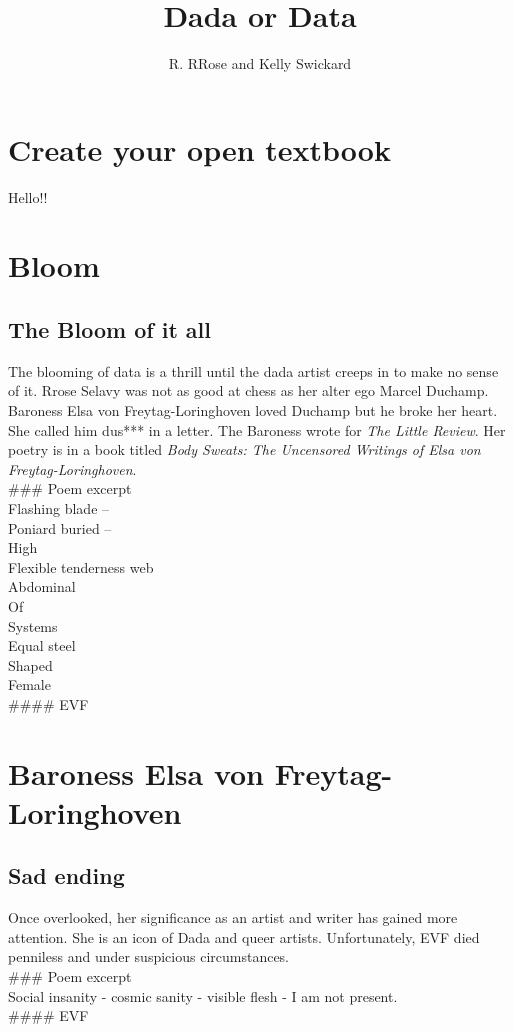 \documentclass[
  openany]{book}
\title{Dada or Data}
\author{R. RRose and Kelly Swickard}
\date{}
\begin{document}
\maketitle

{
\setcounter{tocdepth}{1}
\tableofcontents
}
\hypertarget{create-your-open-textbook}{%
\chapter{Create your open textbook}\label{create-your-open-textbook}}

Hello!!

\hypertarget{bloom}{%
\chapter{Bloom}\label{bloom}}

\hypertarget{the-bloom-of-it-all}{%
\section{The Bloom of it all}\label{the-bloom-of-it-all}}

The blooming of data is a thrill until the dada artist creeps in to make no sense of it. Rrose Selavy was not as good at chess as her alter ego Marcel Duchamp. Baroness Elsa von Freytag-Loringhoven loved Duchamp but he broke her heart. She called him dus*** in a letter. The Baroness wrote for \emph{The Little Review}. Her poetry is in a book titled \emph{Body Sweats: The Uncensored Writings of Elsa von Freytag-Loringhoven}.\\
\#\#\# Poem excerpt\\
Flashing blade --\\
Poniard buried --\\
High\\
Flexible tenderness web\\
Abdominal\\
Of\\
Systems\\
Equal steel\\
Shaped\\
Female\\
\#\#\#\# EVF

\hypertarget{baroness-elsa-von-freytag-loringhoven}{%
\chapter{Baroness Elsa von Freytag-Loringhoven}\label{baroness-elsa-von-freytag-loringhoven}}

\hypertarget{sad-ending}{%
\section{Sad ending}\label{sad-ending}}

Once overlooked, her significance as an artist and writer has gained more attention. She is an icon of Dada and queer artists. Unfortunately, EVF died penniless and under suspicious circumstances.\\
\#\#\# Poem excerpt\\
Social insanity - cosmic sanity - visible flesh - I am not present.\\
\#\#\#\# EVF
\end{document}
